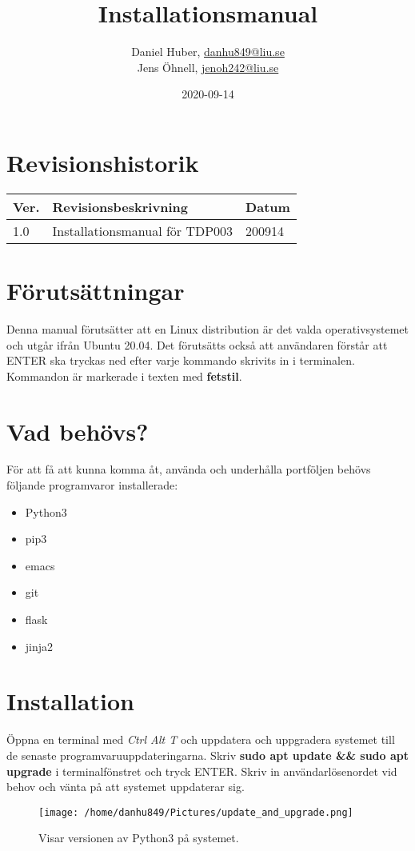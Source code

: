 \documentclass{TDP003mall}
\author{Daniel Huber, \url{danhu849@liu.se}\\
  Jens Öhnell, \url{jenoh242@liu.se}}
\title{Installationsmanual}
\date{2020-09-14}
\begin{document}
\projectpage
\section{Revisionshistorik}
\begin{table}[!h]
\begin{tabularx}{\linewidth}{|l|X|l|}
\hline
Ver. & Revisionsbeskrivning & Datum \\\hline
1.0 & Installationsmanual för TDP003 & 200914 \\\hline
\end{tabularx}
\end{table}

\section{Förutsättningar}
Denna manual förutsätter att en Linux distribution är det valda operativsystemet och utgår ifrån Ubuntu 20.04. Det förutsätts också att användaren förstår att ENTER ska tryckas ned efter varje kommando skrivits in i terminalen. Kommandon är markerade i texten med \textbf{fetstil}.

\section{Vad behövs?}
För att få att kunna komma åt, använda och underhålla portföljen behövs följande programvaror installerade:
\begin{itemize}
  \item Python3
  \item pip3
  \item emacs
  \item git
  \item flask
  \item jinja2   
\end{itemize}

\section{Installation}
Öppna en terminal med \emph{Ctrl Alt T} och uppdatera och uppgradera systemet till de senaste programvaruuppdateringarna. Skriv \textbf{sudo apt update \&\& sudo apt upgrade} i terminalfönstret och tryck ENTER. Skriv in användarlösenordet vid behov och vänta på att systemet uppdaterar sig.
\begin{figure}[h]
  \centerline{\texttt{[image: /home/danhu849/Pictures/update\_and\_upgrade.png]}}
  \caption{Visar versionen av Python3 på systemet.}
  \label{fig}
\end{figure}
\end{document}
